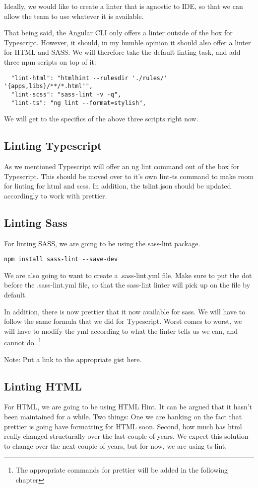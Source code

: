 Ideally, we would like to create a linter that is agnostic to IDE, so that we
can allow the team to use whatever it is available.

That being said, the Angular CLI only offers a linter outside of the box for
Typescript. However, it should, in my humble opinion it should also offer a
linter for HTML and SASS. We will therefore take the default linting task, and
add three npm scripts on top of it:

\begin{verbatim}
  "lint-html": "htmlhint --rulesdir './rules/' '{apps,libs}/**/*.html'",
  "lint-scss": "sass-lint -v -q",
  "lint-ts": "ng lint --format=stylish",
\end{verbatim}

We will get to the specifics of the above three scripts right now.

\subsection{ Linting Typescript }
As we mentioned Typescript will offer an ng lint command out of the box for
Typescript. This should be moved over to it's own lint-ts command to make room
for linting for html and scss. In addition, the tslint.json should be updated
accordingly to work with prettier.

\subsection{ Linting Sass }
For linting SASS, we are going to be using the sass-lint package.
\begin{lstlisting}
npm install sass-lint --save-dev
\end{lstlisting}

We are also going to want to create a .sass-lint.yml file. Make sure to put the
dot before the .sass-lint.yml file, so that the sass-lint linter will pick up
on the file by default.

In addition, there is now prettier that it now available for sass. We will have
to follow the same formula that we did for Typescript. Worst comes to worst, we
will have to modify the yml according to what the linter tells us we can, and
cannot do. \footnote{The appropriate commands for prettier will be added in the
following chapter}

Note: Put a link to the appropriate gist here.

\subsection{ Linting HTML }
For HTML, we are going to be using HTML Hint. It can be argued that it hasn't
been maintained for a while. Two things: One we are banking on the fact that
prettier is going have formatting for HTML soon. Second, how much has html really
changed structurally over the last couple of years. We expect this solution to
change over the next couple of years, but for now, we are using ts-lint.
